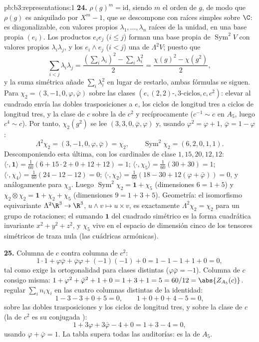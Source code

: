 \begin{solution}{pb:b3:representations:1}
\textbf{24.} $\rho(g)^m = \mathrm{id}$, siendo $m$ el orden de $g$, de
modo que $\rho(g)$ es aniquilado por $X^m - 1$, que se descompone con
raíces simples sobre $\C$: es diagonalizable, con valores propios
$\lambda_1, \dots, \lambda_n$ raíces de la unidad, en una base propia
$(e_i)$. Los productos $e_ie_j$ ($i \leq j$) forman una base propia de
$\operatorname{Sym}^2V$ con valores propios $\lambda_i\lambda_j$, y los
$e_i \wedge e_j$ ($i < j$) una de $\Lambda^2V$; puesto que
\[
\sum_{i<j}\lambda_i\lambda_j
= \frac{(\sum_i\lambda_i)^2 - \sum_i\lambda_i^2}2
= \frac{\chi(g)^2 - \chi(g^2)}2,
\]
y la suma simétrica añade $\sum_i\lambda_i^2$ en lugar de restarlo,
ambas fórmulas se siguen. Para $\chi_2 = (3, -1,
0, \varphi, \bar\varphi)$ sobre las clases $(e, (2,2)\text{-},
3\text{-ciclos}, c, c^2)$: elevar al cuadrado envía las dobles
trasposiciones a $e$, los ciclos de longitud tres a ciclos de longitud
tres, y la clase de $c$ sobre la de $c^2$ y recíprocamente ($c^{-1} \sim
c$ en $A_5$, luego $c^4 \sim c$). Por tanto, $\chi_2(g^2)$ se lee $(3,
3, 0, \bar\varphi, \varphi)$ y, usando $\varphi^2 = \varphi
+ 1$, $\bar\varphi = 1 - \varphi$:
\[
\Lambda^2\chi_2 = (3, -1, 0, \varphi, \bar\varphi) = \chi_2,
\qquad
\operatorname{Sym}^2\chi_2 = (6, 2, 0, 1, 1) .
\]
Descomponiendo esta última, con los cardinales de clase $1, 15, 20, 12,
12$: $\langle\cdot, \mathbf 1\rangle = \frac1{60}(6 +
15\cdot2 + 0 + 12 + 12) = 1$; $\langle\cdot, \chi_5\rangle =
\frac1{60}(30 + 30) = 1$; $\langle\cdot, \chi_4\rangle =
\frac1{60}(24 - 12 - 12) = 0$; $\langle\cdot, \chi_2\rangle =
\frac1{60}(18 - 30 + 12(\varphi + \bar\varphi)) = 0$, y análogamente
para $\chi_3$. Luego $\operatorname{Sym}^2\chi_2 =
\mathbf 1 + \chi_5$ (dimensiones $6 = 1 + 5$) y
$\chi_2\otimes\chi_2 = \mathbf 1 + \chi_2 + \chi_5$
(dimensiones $9 = 1 + 3 + 5$). Geometría: el isomorfismo equivariante
$\Lambda^2\R^3 \to \R^3$, $u \wedge v \mapsto u
\times v$, es exactamente $\Lambda^2\chi_2 = \chi_2$ para un grupo de
rotaciones; el sumando $\mathbf 1$ del cuadrado simétrico es la forma
cuadrática invariante $x^2 + y^2 + z^2$, y $\chi_5$ vive en el espacio
de dimensión cinco de los tensores simétricos de traza nula (las
cuádricas armónicas).

\textbf{25.} Columna de $c$ contra columna de $c^2$:
\[
1\cdot1 + \varphi\bar\varphi + \bar\varphi\varphi +
(-1)(-1) + 0 = 1 - 1 - 1 + 1 + 0 = 0,
\]
tal como exige la ortogonalidad para clases distintas ($\varphi
\bar\varphi = -1$). Columna de $c$ consigo misma: $1 +
\varphi^2 + \bar\varphi^2 + 1 + 0 = 1 + 3 + 1 = 5 = 60/12 =
\abs{Z_{A_5}(c)}$. 
regular $\sum_in_i\chi_i$ en las cuatro columnas distintas de la
identidad:
\[
1 - 3 - 3 + 0 + 5 = 0, \qquad
1 + 0 + 0 + 4 - 5 = 0,
\]
sobre las dobles trasposiciones y los ciclos de longitud tres, y sobre
la clase de $c$ (la de $c^2$ es su conjugada
):
\[
1 + 3\varphi + 3\bar\varphi - 4 + 0 = 1 + 3 - 4 = 0,
\]
usando $\varphi + \bar\varphi = 1$. La tabla supera todas las
auditorías: es la  de $A_5$.
\end{solution}
